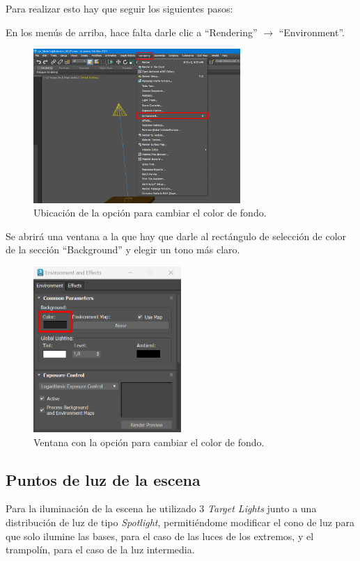 \documentclass{article}
\begin{document}
\bigskip

Para realizar esto hay que seguir los siguientes pasos:

En los menús de arriba, hace falta darle clic a ``Rendering'' $\rightarrow$ ``Environment''.

\begin{figure}[H]
    \centering
    \includegraphics[width=0.7\textwidth]{imagenes/misc/bg-color1.png}
    \caption{Ubicación de la opción para cambiar el color de fondo.}
 \end{figure}

Se abrirá una ventana a la que hay que darle al rectángulo de selección de color de la sección ``Background'' y elegir un tono más claro.

\begin{figure}[H]
    \centering
    \includegraphics[width=0.5\textwidth]{imagenes/misc/bg-color2.png}
    \caption{Ventana con la opción para cambiar el color de fondo.}
 \end{figure}

\subsection{Puntos de luz de la escena}
Para la iluminación de la escena he utilizado 3 \textit{Target Lights} junto a una distribución de luz de tipo \textit{Spotlight}, permitiéndome modificar el cono de luz para que solo ilumine las bases, para el caso de las luces de los extremos, y el trampolín, para el caso de la luz intermedia.
\end{document}
